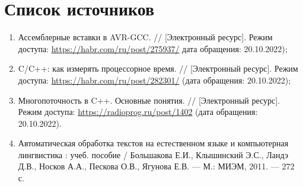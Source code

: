 %



\section*{\large Список источников}
\begin{enumerate}
	\item Ассемблерные вставки в AVR-GCC. // [Электронный ресурс]. Режим доступа: \url{https://habr.com/ru/post/275937/} дата обращения: 20.10.2022); \label{bib:1}
	\item C/C++: как измерять процессорное время. // [Электронный ресурс]. Режим доступа: \url{https://habr.com/ru/post/282301/} (дата обращения: 20.10.2022); \label{bib:2}
	\item Многопоточность в C++. Основные понятия. // [Электронный ресурс]. Режим доступа: 
	\url{https://radioprog.ru/post/1402} (дата обращения: 20.10.2022). \label{bib:3}
	\item Автоматическая обработка текстов на естественном языке и компьютерная лингвистика : учеб. пособие / Большакова Е.И., Клышинский Э.С., Ландэ Д.В., Носков А.А., Пескова О.В., Ягунова Е.В. — М.: МИЭМ, 2011. — 272 с. \label{bib:4}
\end{enumerate}